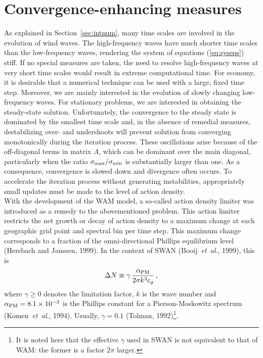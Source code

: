 \documentclass[12pt]{book}
\begin{document}
\section{Convergence-enhancing measures} \label{sec:stab}

As explained in Section~\ref{sec:intnum},
many time scales are involved in the evolution of wind waves. The high-frequency waves have much shorter
time scales than the low-frequency waves, rendering the system of equations
(\ref{eq:syseqs}) stiff. If no special measures are taken,
the need to resolve high-frequency waves at very short time scales would result in extreme computational time. For economy,
it is desirable that a numerical technique can be used with a large, fixed time step. Moreover, we are
mainly interested in the evolution of slowly changing low-frequency waves. For stationary problems,
we are interested in obtaining the steady-state solution.
Unfortunately, the convergence to the steady state is dominated by the
smallest time scale and, in the absence of remedial measures, destabilizing
over- and undershoots will prevent
solution from converging monotonically during the iteration process.
These oscillations arise because of the off-diagonal terms in matrix $A$,
which can be dominant over the main diagonal, particularly when the ratio
$\sigma_{\rm max}/\sigma_{\rm min}$ is substantially larger than one. As a consequence,
convergence is slowed down and divergence often occurs.
To accelerate the iteration process without generating instabilities, appropriately small updates must be made
to the level of action density.
\\[2ex]
\noindent
With the development of the WAM model, a so-called action density limiter was introduced as a remedy to the abovementioned
problem. This action limiter restricts the net growth or
decay of action density to a maximum change at each geographic grid point and spectral bin per time step.
This maximum change corresponds to a fraction of the
omni-directional Phillips equilibrium level (Hersbach and Janssen, 1999).
In the context of SWAN (Booij~{\it et~al}., 1999), this is
\begin{equation}
  \Delta N \equiv \gamma \, \frac{\alpha_{\rm PM}}{2 \sigma k^3 c_g} \, ,
  \label{eq:limit}
\end{equation}
where $\gamma \geq 0$ denotes the limitation factor, $k$ is the wave number and
$\alpha_{\rm PM} = 8.1 \times 10^{-3}$ is the Phillips constant for a Pierson-Moskowitz spectrum
(Komen~{\it et~al}., 1994). Usually, $\gamma = 0.1$ (Tolman,
1992)\footnote{It is
  noted here that the effective $\gamma$ used in SWAN is not equivalent to that of
   WAM: the former is a factor $2\pi$ larger.}.
\end{document}
